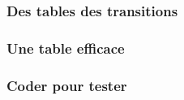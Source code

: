 \subsubsection{Des tables des transitions}

    


\subsubsection{Une table efficace} \label{better-2-and-3}

    


\subsubsection{Coder pour tester}

    
